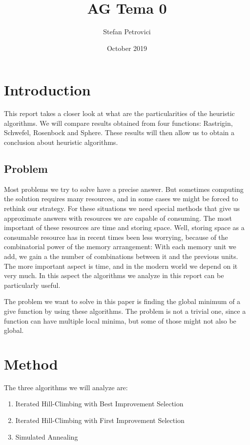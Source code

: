 \documentclass{article}
\title{AG Tema 0}
\author{Stefan Petrovici}
\date{October 2019}
\begin{document}
\maketitle

\section{Introduction}
This report takes a closer look at what are the particularities of the heuristic algorithms. We will compare results obtained from four functions: Rastrigin, Schwefel, Rosenbock and Sphere. These results will then allow us to obtain a conclusion about heuristic algorithms.

\subsection{Problem}
Most problems we try to solve have a precise answer. But sometimes computing the solution requires many resources, and in some cases we might be forced to rethink our strategy. For these situations we need special methods that give us approximate answers with resources we are capable of consuming.
The most important of these resources are time and storing space. Well, storing space as a consumable resource has in recent times been less worrying, because of the combinatorial power of the memory arrangement: With each memory unit we add, we gain a the number of combinations between it and the previous units.
The more important aspect is time, and in the modern world we depend on it very much. In this aspect the algorithms we analyze in this report can be particularly useful.

The problem we want to solve in this paper is finding the global minimum of a give function by using these algorithms. The problem is not a trivial one, since a function can have multiple local minima, but some of those might not also be global.

\section{Method}

The three algorithms we will analyze are:
\begin{enumerate}
\item Iterated Hill-Climbing with Best Improvement Selection
\item Iterated Hill-Climbing with First Improvement Selection
\item Simulated Annealing
\end{enumerate} 
\end{document}
